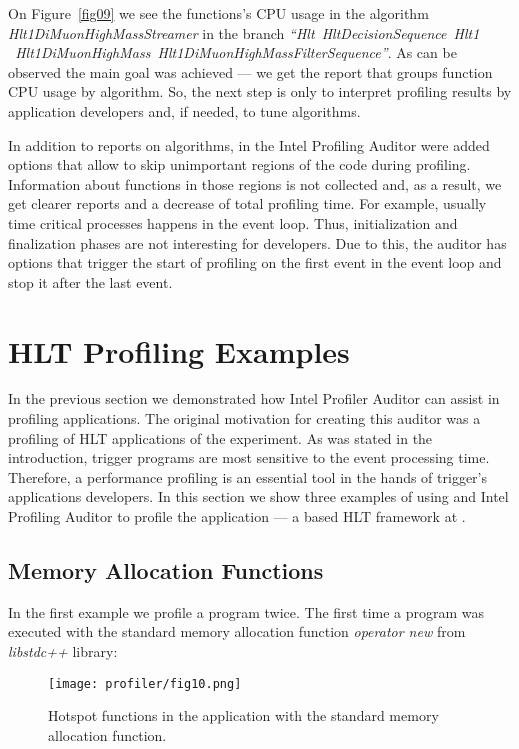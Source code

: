 On Figure~\ref{fig09} we see the functions's CPU usage  in the algorithm {\it
Hlt1DiMuonHighMassStreamer\/} in the branch {\it ``Hlt~HltDecisionSequence~Hlt1
~Hlt1DiMuonHighMass~Hlt1DiMuonHighMassFilterSequence''}. As can be observed the
main goal was achieved --- we get the report that groups function CPU usage by
algorithm. So, the next step is only to interpret profiling results by
application developers and, if needed, to tune algorithms.

In addition to reports on algorithms, in the \gaudi Intel Profiling Auditor were
added options that allow to skip unimportant regions of the code during
profiling. Information about functions in those regions is not collected and,
as a result, we get clearer reports and a decrease of total profiling time. For
example, usually time critical processes happens in the event loop. Thus,
initialization and finalization phases are not interesting for developers. Due
to this, the auditor has options that trigger the start of  profiling on the
first event in the event loop and stop it after the last event.


\section{HLT Profiling Examples}

In the previous section we demonstrated how \gaudi Intel Profiler Auditor can
assist  in profiling \gaudi applications. The original motivation for creating
this auditor was a profiling of HLT applications of the \lhcb experiment. As was
stated in the introduction, trigger programs are most sensitive to the event
processing time. Therefore, a performance profiling is an essential tool in the
hands of trigger's applications developers. In this section we show three
examples of using \amp and \gaudi Intel Profiling Auditor to profile the \moore
application --- a \gaudi based HLT framework at \lhcb.

\subsection{Memory Allocation Functions}

In the first example we profile a \moore program twice. The first time a program
was executed with the standard memory allocation function {\it operator new\/}
from {\it libstdc++\/} library:

\begin{figure}[H]
\texttt{[image: profiler/fig10.png]}
\caption{Hotspot functions in the \moore application with the
standard memory allocation function.}
\label{fig10}
\end{figure}

